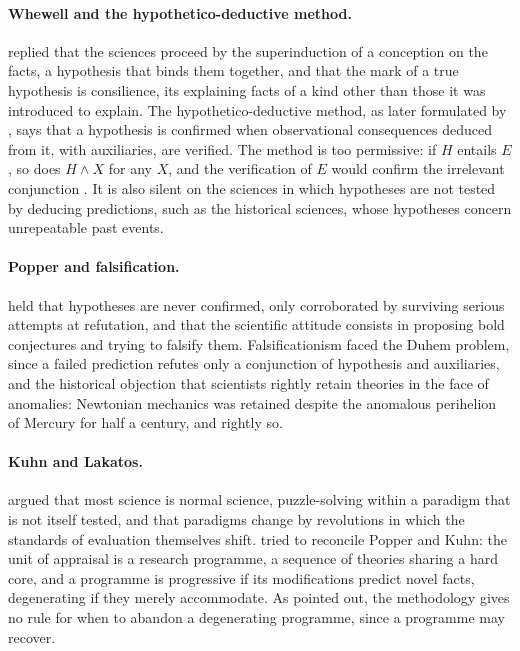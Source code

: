 \documentclass{situationist-preprint}
\begin{document}
\paragraph{Whewell and the hypothetico-deductive method.} \citet{Whewell1840} replied that the sciences proceed by the superinduction of a conception on the facts, a hypothesis that binds them together, and that the mark of a true hypothesis is consilience, its explaining facts of a kind other than those it was introduced to explain. The hypothetico-deductive method, as later formulated by \citet{Hempel1966}, says that a hypothesis is confirmed when observational consequences deduced from it, with auxiliaries, are verified. The method is too permissive: if $H$ entails $E$, so does $H \wedge X$ for any $X$, and the verification of $E$ would confirm the irrelevant conjunction \citep{Glymour1980}. It is also silent on the sciences in which hypotheses are not tested by deducing predictions, such as the historical sciences, whose hypotheses concern unrepeatable past events.

\paragraph{Popper and falsification.} \citet{Popper1959} held that hypotheses are never confirmed, only corroborated by surviving serious attempts at refutation, and that the scientific attitude consists in proposing bold conjectures and trying to falsify them. Falsificationism faced the Duhem problem, since a failed prediction refutes only a conjunction of hypothesis and auxiliaries, and the historical objection that scientists rightly retain theories in the face of anomalies: Newtonian mechanics was retained despite the anomalous perihelion of Mercury for half a century, and rightly so.

\paragraph{Kuhn and Lakatos.} \citet{Kuhn1962} argued that most science is normal science, puzzle-solving within a paradigm that is not itself tested, and that paradigms change by revolutions in which the standards of evaluation themselves shift. \citet{Lakatos1970} tried to reconcile Popper and Kuhn: the unit of appraisal is a research programme, a sequence of theories sharing a hard core, and a programme is progressive if its modifications predict novel facts, degenerating if they merely accommodate. As \citet{Feyerabend1975} pointed out, the methodology gives no rule for when to abandon a degenerating programme, since a programme may recover.
\end{document}
